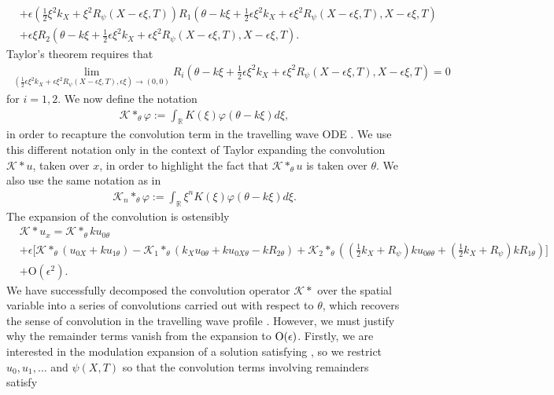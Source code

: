 \documentclass[11pt,leqno]{article}
\numberwithin{equation}{section}
\newcommand{\R}{\mathbb R}
\theoremstyle{definition}
\begin{document}
\begin{appendices}
\begin{align*}
		&+ \epsilon\left(\frac{1}{2}\xi^{2}k_{X} + \xi^{2}R_{\psi}(X-\epsilon\xi,T)\right)R_{1}\left(\theta - k\xi + \frac{1}{2}\epsilon\xi^{2}k_{X} + \epsilon\xi^{2}R_{\psi}(X-\epsilon\xi,T),X-\epsilon\xi,T\right)\\
		&+ \epsilon\xi R_{2}\left(\theta - k\xi + \frac{1}{2}\epsilon\xi^{2}k_{X} + \epsilon\xi^{2}R_{\psi}(X-\epsilon\xi,T),X-\epsilon\xi,T\right).
	\end{align*}
	Taylor's theorem requires that
	\begin{align*}
		\lim_{\left(\frac{1}{2}\epsilon\xi^{2}k_{X} + \epsilon\xi^{2}R_{\psi}(X-\epsilon\xi,T),\epsilon\xi\right)\rightarrow (0,0)}R_{i}\left(\theta - k\xi + \frac{1}{2}\epsilon\xi^{2}k_{X} + \epsilon\xi^{2}R_{\psi}(X-\epsilon\xi,T),X - \epsilon\xi,T\right) = 0
	\end{align*}
	for $ i = 1,2 $. We now define the notation
	\begin{align*}
		\mathcal{K}*_{\theta}\varphi := \int_{\R}K(\xi)\varphi(\theta - k\xi)d\xi,
	\end{align*}
	in order to recapture the convolution term in the travelling wave ODE . We use this different notation only in the context of Taylor expanding the convolution $ \mathcal{K}*u $, taken over $ x $, in order to highlight the fact that $ \mathcal{K}*_{\theta}u $ is taken over $ \theta $. We also use the same notation as in 
	\begin{align*}
		\mathcal{K}_{n}*_{\theta}\varphi := \int_{\R}\xi^{n}K(\xi)\varphi(\theta - k\xi)d\xi.
	\end{align*}
	The expansion of the convolution is ostensibly
	\begin{align*}
		&\mathcal{K}*u_{x} = \mathcal{K}*_{\theta}ku_{0\theta}\\
		&+ \epsilon\bigg[\mathcal{K}*_{\theta}(u_{0X} + ku_{1\theta}) - \mathcal{K}_{1}*_{\theta}\left(k_{X}u_{0\theta} + ku_{0X\theta} - kR_{2\theta}\right) + \mathcal{K}_{2}*_{\theta}\left(\left(\frac{1}{2}k_{X} + R_{\psi}\right)ku_{0\theta\theta} + \left(\frac{1}{2}k_{X} + R_{\psi}\right)kR_{1\theta}\right)\bigg]\\
		&+ \mathrm{O}(\epsilon^{2}).
	\end{align*}
	We have successfully decomposed the convolution operator $ \mathcal{K}* $ over the spatial variable into a series of convolutions carried out with respect to $ \theta $, which recovers the sense of convolution in the travelling wave profile . However, we must justify why the remainder terms vanish from the expansion to $ {\rm O}(\epsilon) $. Firstly, we are interested in the modulation expansion of a solution satisfying , so we restrict $ u_{0},u_{1},\dots $ and $ \psi(X,T) $ so that the convolution terms involving remainders satisfy

\end{appendices}
\end{document}
